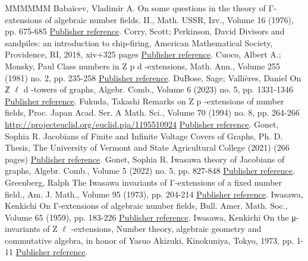 \begin{thebibliography}{MMMMMM}
 Babaĭcev, Vladimir A. On some questions in the theory of Γ-extensions of algebraic number fields. II., Math. USSR, Izv., Volume 16 (1976), pp. 675-685 \href{https://alco.centre-mersenne.org/articles/10.5802/alco.366/#babaichev}{Publisher reference}.
 Corry, Scott; Perkinson, David Divisors and sandpiles: an introduction to chip-firing, American Mathematical Society, Providence, RI, 2018, xiv+325 pages \href{https://alco.centre-mersenne.org/articles/10.5802/alco.366/#corry-Perkinson}{Publisher reference}.
 Cuoco, Albert A.; Monsky, Paul Class numbers in Z p d -extensions, Math. Ann., Volume 255 (1981) no. 2, pp. 235-258 \href{https://alco.centre-mersenne.org/articles/10.5802/alco.366/#cuoco-monsky}{Publisher reference}.
 DuBose, Sage; Vallières, Daniel On ℤ \(\ell\) d -towers of graphs, Algebr. Comb., Volume 6 (2023) no. 5, pp. 1331-1346 \href{https://alco.centre-mersenne.org/articles/10.5802/alco.366/#dubose-vallieres}{Publisher reference}.
 Fukuda, Takashi Remarks on Z p -extensions of number fields, Proc. Japan Acad. Ser. A Math. Sci., Volume 70 (1994) no. 8, pp. 264-266 \url{http://projecteuclid.org/euclid.pja/1195510924} \href{https://alco.centre-mersenne.org/articles/10.5802/alco.366/#fukuda}{Publisher reference}.
 Gonet, Sophia R. Jacobians of Finite and Infinite Voltage Covers of Graphs, Ph. D. Thesis, The University of Vermont and State Agricultural College (2021) (266 pages) \href{https://alco.centre-mersenne.org/articles/10.5802/alco.366/#diss-gonet}{Publisher reference}.
 Gonet, Sophia R. Iwasawa theory of Jacobians of graphs, Algebr. Comb., Volume 5 (2022) no. 5, pp. 827-848 \href{https://alco.centre-mersenne.org/articles/10.5802/alco.366/#gonet}{Publisher reference}.
 Greenberg, Ralph The Iwasawa invariants of Γ-extensions of a fixed number field., Am. J. Math., Volume 95 (1973), pp. 204-214 \href{https://alco.centre-mersenne.org/articles/10.5802/alco.366/#green_73}{Publisher reference}.
 Iwasawa, Kenkichi On Γ-extensions of algebraic number fields, Bull. Amer. Math. Soc., Volume 65 (1959), pp. 183-226 \href{https://alco.centre-mersenne.org/articles/10.5802/alco.366/#iwasawa}{Publisher reference}.
 Iwasawa, Kenkichi On the μ-invariants of Z \(\ell\) -extensions, Number theory, algebraic geometry and commutative algebra, in honor of Yasuo Akizuki, Kinokuniya, Tokyo, 1973, pp. 1-11 \href{https://alco.centre-mersenne.org/articles/10.5802/alco.366/#iwasawa_mu}{Publisher reference}.

\end{thebibliography}
